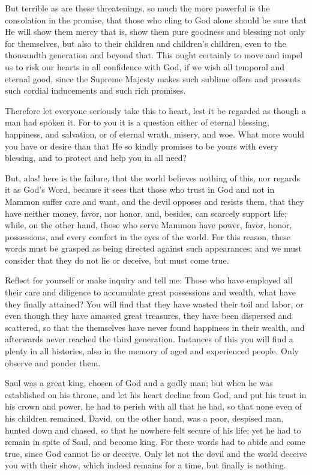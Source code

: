 But terrible as are these threatenings, so much the more powerful is
the consolation in the promise, that those who cling to God alone
should be sure that He will show them mercy that is, show them pure
goodness and blessing not only for themselves, but also to their
children and children's children, even to the thousandth generation and
beyond that. This ought certainly to move and impel us to risk our
hearts in all confidence with God, if we wish all temporal and eternal
good, since the Supreme Majesty makes such sublime offers and presents
such cordial inducements and such rich promises.

Therefore let everyone seriously take this to heart, lest it be
regarded as though a man had spoken it. For to you it is a question
either of eternal blessing, happiness, and salvation, or of eternal
wrath, misery, and woe. What more would you have or desire than that He
so kindly promises to be yours with every blessing, and to protect and
help you in all need?

But, alas! here is the failure, that the world believes nothing of
this, nor regards it as God's Word, because it sees that those who
trust in God and not in Mammon suffer care and want, and the devil
opposes and resists them, that they have neither money, favor, nor
honor, and, besides, can scarcely support life; while, on the other
hand, those who serve Mammon have power, favor, honor, possessions, and
every comfort in the eyes of the world. For this reason, these words
must be grasped as being directed against such appearances; and we must
consider that they do not lie or deceive, but must come true.

Reflect for yourself or make inquiry and tell me: Those who have
employed all their care and diligence to accumulate great possessions
and wealth, what have they finally attained? You will find that they
have wasted their toil and labor, or even though they have amassed
great treasures, they have been dispersed and scattered, so that the
themselves have never found happiness in their wealth, and afterwards
never reached the third generation. Instances of this you will find a
plenty in all histories, also in the memory of aged and experienced
people. Only observe and ponder them.

Saul was a great king, chosen of God and a godly man; but when he was
established on his throne, and let his heart decline from God, and put
his trust in his crown and power, he had to perish with all that he
had, so that none even of his children remained. David, on the other
hand, was a poor, despised man, hunted down and chased, so that he
nowhere felt secure of his life; yet he had to remain in spite of Saul,
and become king. For these words had to abide and come true, since God
cannot lie or deceive. Only let not the devil and the world deceive you
with their show, which indeed remains for a time, but finally is
nothing.

